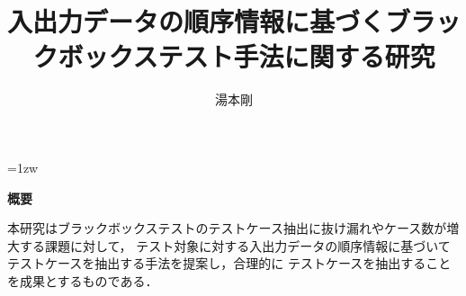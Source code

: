\documentclass[a4paper,12pt]{jreport}
\title{入出力データの順序情報に基づくブラックボックステスト手法に関する研究}
\author{湯本剛}
\begin{document}
\maketitle
\thispagestyle{empty}
\newpage

\thispagestyle{empty}
\vspace*{20pt plus 1fil}
\parindent=1zw
\noindent
\begin{center}
{\bf 概要}
\vspace{5mm}
\end{center}
本研究はブラックボックステストのテストケース抽出に抜け漏れやケース数が増大する課題に対して，
テスト対象に対する入出力データの順序情報に基づいてテストケースを抽出する手法を提案し，合理的に
テストケースを抽出することを成果とするものである．


\par
\vspace{0pt plus 1fil}
\newpage

\tableofcontents
\listoffigures

\pagebreak \setcounter{page}{1}






%



\cite{IEEE610}
\cite{yumoto2006}
\cite{ISO29119}
\cite{Ostrand:1988:CMS:62959.62964}
\cite{Grindal:2007:IPM:1332044.1332085}
\cite{2008kotani}
\cite{2011ogawa}
\cite{takagi2010concurrent}
\cite{eldh2011analysis}
\cite{hutchins1994experiments}
\cite{rothermel2001prioritizing}
\cite{pressman2005software}





\cite{ISTQB}

\cite{fosdick1976data}
\cite{rapps1982data}

\cite{rapps1985selecting}
\cite{farooq2013empirical}
\cite{weinberg2008perfect}
\cite{elbaum2002test}
\cite{elbaum2000prioritizing}
\cite{stocks1996framework}
\cite{young2008software}
\cite{briand2002uml}
\cite{rothermel2002empirical}
\cite{ammann2016introduction}
\end{document}
